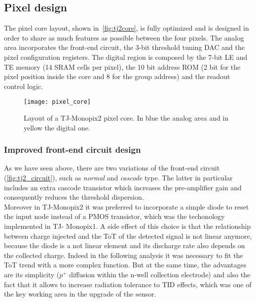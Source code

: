 
\subsection{Pixel design}

The  pixel core layout, shown in~\autoref{fig:tj2core}, is fully optimized and is designed in order to share as much features as possible between the four pixels. The analog area incorporates the front-end circuit, the 3-bit threshold tuning DAC and the pixel configuration registers. The digital region is composed by the 7-bit LE and TE memory (14 SRAM cells per pixel), the 10 bit address ROM (2 bit for the pixel position inside the core and 8 for the group address) and the readout control logic. 

\begin{comment}
Two different token signals are used to set the priority of the pixels during the readout: the \textit{fast} one that propagates across the double column estabilishing the priority between the cores and the \textit{local} one, which arbitrates the reading order of the four pixels inside each core.
\end{comment}

\begin{figure}[h!]
\centering
\texttt{[image: pixel\_core]}
\caption{Layout of a TJ-Monopix2  pixel core. In blue the analog area and in yellow the digital one.}
\label{fig:tj2core}
\end{figure}



\subsubsection{Improved front-end circuit design}\label{sec:improved_circuit}

As we have seen above, there are two variations of the front-end circuit (\autoref{fig:tj2_circuit}), such as \textit{normal} and \textit{cascode} type. The latter in particular includes an extra cascode transistor which increases the pre-amplifier gain and consequently reduces the threshold dispersion.\\
Moreover in TJ-Monopix2 it was preferred to incorporate a simple diode to reset the input node instead of a PMOS transistor, which was the techonology implemented in TJ- Monopix1. A side effect of this choice is that the relationship between charge injected and the ToT of the detected signal is not linear anymore, because the diode is a not linear element and its discharge rate also depends on the collected charge. Indeed in the following analysis it was necessary to fit the ToT trend with a more complex function. But at the same time, the advantages are its simplicity ($p^{+}$ diffusion within the n-well collection electrode) and also the fact that it allows to increase radiation tolerance to TID effects, which was one of the key working area in the upgrade of the sensor.


